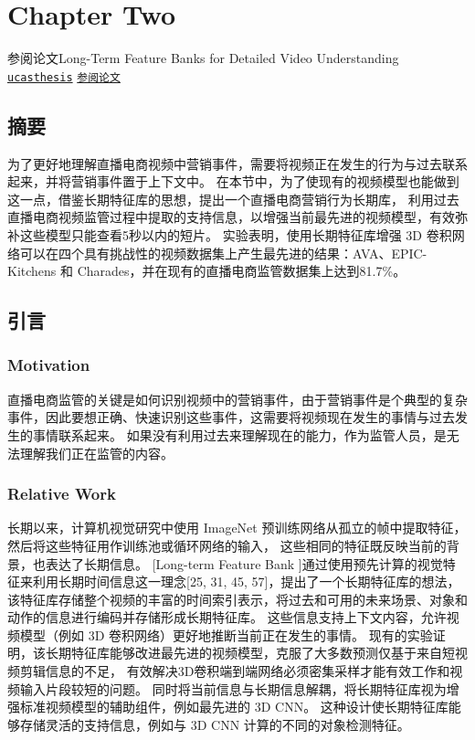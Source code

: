 \chapter{Chapter Two}\label{chap:Two}

参阅论文\textsf{Long-Term Feature Banks for Detailed Video Understanding}
\href{https://github.com/Henry-sun1974/ucasthesis}{\texttt{ucasthesis}} 
\href{https://github.com/facebookresearch/video-long-term-feature-banks}{\texttt{参阅论文}}

\section*{摘要} 
为了更好地理解直播电商视频中营销事件，需要将视频正在发生的行为与过去联系起来，并将营销事件置于上下文中。
在本节中，为了使现有的视频模型也能做到这一点，借鉴长期特征库的思想，提出一个直播电商营销行为长期库，
利用过去直播电商视频监管过程中提取的支持信息，以增强当前最先进的视频模型，有效弥补这些模型只能查看5秒以内的短片。
实验表明，使用长期特征库增强 3D 卷积网络可以在四个具有挑战性的视频数据集上产生最先进的结果：AVA、EPIC-Kitchens 
和 Charades，并在现有的直播电商监管数据集上达到81.7\%。

\section{引言}
\subsection{Motivation}
直播电商监管的关键是如何识别视频中的营销事件，由于营销事件是个典型的复杂事件，因此要想正确、快速识别这些事件，这需要将视频现在发生的事情与过去发生的事情联系起来。 如果没有利用过去来理解现在的能力，作为监管人员，是无法理解我们正在监管的内容。

\subsection{Relative Work}
长期以来，计算机视觉研究中使用 ImageNet 预训练网络从孤立的帧中提取特征，然后将这些特征用作训练池或循环网络的输入，
这些相同的特征既反映当前的背景，也表达了长期信息。
[Long-term Feature Bank ]通过使用预先计算的视觉特征来利用长期时间信息这一理念[25, 31, 45, 57]，提出了一个长期特征库的想法，
该特征库存储整个视频的丰富的时间索引表示，将过去和可用的未来场景、对象和动作的信息进行编码并存储形成长期特征库。
这些信息支持上下文内容，允许视频模型（例如 3D 卷积网络）更好地推断当前正在发生的事情。
现有的实验证明，该长期特征库能够改进最先进的视频模型，克服了大多数预测仅基于来自短视频剪辑信息的不足，
有效解决3D卷积端到端网络必须密集采样才能有效工作和视频输入片段较短的问题。
同时将当前信息与长期信息解耦，将长期特征库视为增强标准视频模型的辅助组件，例如最先进的 3D CNN。 这种设计使长期特征库能够存储灵活的支持信息，例如与 3D CNN 计算的不同的对象检测特征。


